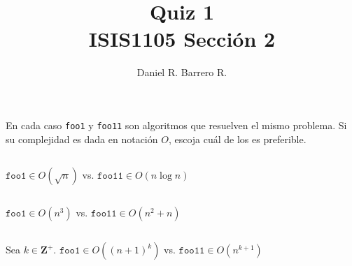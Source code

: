 \documentclass{amsart}
\title{Quiz 1 \\ ISIS1105 Sección 2}
\author{Daniel R. Barrero R.}
\begin{document}
\maketitle

\section{} En cada caso \texttt{foo1} y \texttt{foo11} son algoritmos que resuelven
el mismo problema. Si su complejidad es dada en notación $O$, escoja cuál de los es
preferible.

\subsection{} $\mathtt{foo1} \in O(\sqrt{n})$ vs. $\mathtt{foo11} \in O(n\log n)$

\subsection{} $\mathtt{foo1} \in O(n^3)$ vs. $\mathtt{foo11} \in O(n^2 + n)$

\subsection{} Sea $k \in \mathbf{Z}^+$. $\mathtt{foo1} \in O(\left( n+1 \right)^k)$ vs. $\mathtt{foo11} \in O(n^{k+1})$
\end{document}
